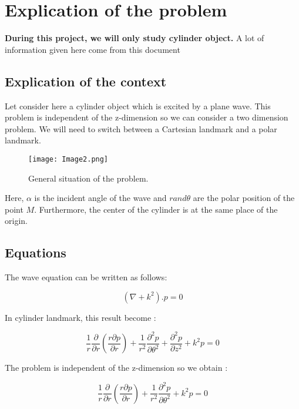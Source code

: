 \chapter{Explication of the problem}

\medskip
\textbf{During this project, we will only study cylinder object.}
A lot of information given here come from this document \cite{EDP}

\section{Explication of the context}

Let consider here a cylinder object which is excited by a plane wave. This problem is independent of the z-dimension so we can consider a two dimension problem.
We will need to switch between a Cartesian landmark and a polar landmark.
\begin{figure}[H]
\centering
    \texttt{[image: Image2.png]}
    \caption{General situation of the problem.}
    \label{fig:Image2}
\end{figure}

Here, $\alpha$ is the incident angle of the wave and $r and \theta$ are the polar position of the point $M$. Furthermore, the center of the cylinder is at the same place of the origin. 

\section{Equations}


The wave equation can be written as follows:

\begin{equation}
 (\nabla + k^2).p = 0 
\end{equation}

In cylinder landmark, this result become :

\begin{equation}
 \frac{1}{r}\frac{\partial}{\partial r}(
 \frac{ r \partial p}{\partial r}) + \frac{1}{r^2}\frac{\partial^2 p}{\partial \theta^2} + \frac{\partial^2 p}{\partial z^2} + k^2 p = 0 
\end{equation}

The problem is independent of the z-dimension so we obtain :

\begin{equation}
 \frac{1}{r}\frac{\partial}{\partial r}(
 \frac{ r \partial p}{\partial r}) + \frac{1}{r^2}\frac{\partial^2 p}{\partial \theta^2} + k^2 p = 0 
\end{equation}

